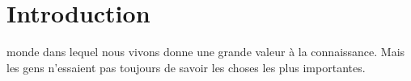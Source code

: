 
\chapter{Introduction}

 monde dans lequel nous vivons donne une grande valeur à la
 connaissance. Mais les gens n'essaient pas toujours de savoir les choses les
 plus importantes.




